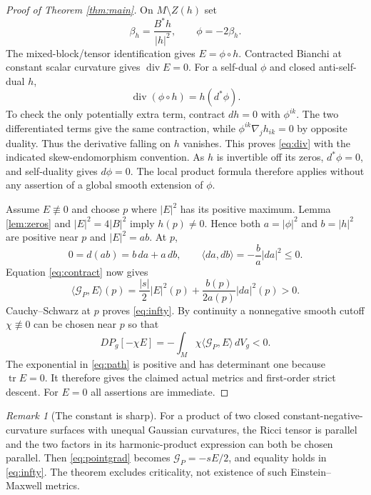 \documentclass[11pt,a4paper]{article}
\theoremstyle{remark}\newtheorem{remark}[theorem]{Remark}
\newcommand{\tr}{\operatorname{tr}}
\newcommand{\diver}{\operatorname{div}}
\newcommand{\GP}{\mathcal G_P}
\newcommand{\ip}[2]{\langle #1,#2\rangle}
\numberwithin{equation}{section}
\begin{document}
\begin{proof}[Proof of Theorem \ref{thm:main}]
On $M\setminus Z(h)$ set
\[
 \beta_h=\frac{B^*h}{|h|^2},\qquad \phi=-2\beta_h.
\]
The mixed-block/tensor identification gives $E=\phi\circ h$.
Contracted Bianchi at constant scalar curvature gives $\diver E=0$.
For a self-dual $\phi$ and closed anti-self-dual $h$,
\begin{equation}\label{eq:div}
 \diver(\phi\circ h)=h(d^*\phi).
\end{equation}
To check the only potentially extra term, contract $dh=0$ with
$\phi^{ik}$. The two differentiated terms give the same contraction,
while $\phi^{ik}\nabla_jh_{ik}=0$ by opposite duality. Thus the derivative
falling on $h$ vanishes. This proves \eqref{eq:div} with the indicated
skew-endomorphism convention. As $h$ is invertible off its zeros,
$d^*\phi=0$, and self-duality gives $d\phi=0$. The local product formula
therefore applies without any assertion of a global smooth extension of
$\phi$.

Assume $E\not\equiv0$ and choose $p$ where $|E|^2$ has its positive
maximum. Lemma \ref{lem:zeros} and $|E|^2=4|B|^2$ imply $h(p)\ne0$.
Hence both $a=|\phi|^2$ and $b=|h|^2$ are positive near $p$ and
$|E|^2=ab$. At $p$,
\[
 0=d(ab)=b\,da+a\,db,
 \qquad \ip{da}{db}=-\frac ba|da|^2\le0.
\]
Equation \eqref{eq:contract} now gives
\begin{equation}\label{eq:max}
 \ip{\GP}{E}(p)=\frac{|s|}{2}|E|^2(p)
                  +\frac{b(p)}{2a(p)}|da|^2(p)>0.
\end{equation}
Cauchy--Schwarz at $p$ proves \eqref{eq:infty}. By continuity a nonnegative
smooth cutoff $\chi\not\equiv0$ can be chosen near $p$ so that
\[
 DP_g[-\chi E]=-\int_M\chi\ip{\GP}{E}\,dV_g<0.
\]
The exponential in \eqref{eq:path} is positive and has determinant one
because $\tr E=0$. It therefore gives the claimed actual metrics and
first-order strict descent. For $E=0$ all assertions are immediate.
\end{proof}

\begin{remark}[The constant is sharp]
For a product of two closed constant-negative-curvature surfaces with
unequal Gaussian curvatures, the Ricci tensor is parallel and the two
factors in its harmonic-product expression can both be chosen parallel.
Then \eqref{eq:pointgrad} becomes $\GP=-sE/2$, and equality holds in
\eqref{eq:infty}. The theorem excludes criticality, not existence of such
Einstein--Maxwell metrics.
\end{remark}
\end{document}
